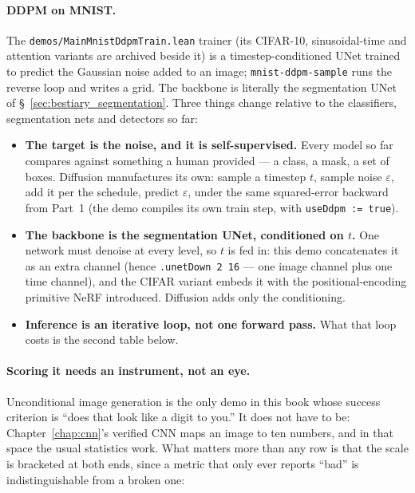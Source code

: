 \paragraph{DDPM on MNIST.} The \texttt{demos/MainMnistDdpmTrain.lean} trainer
(its CIFAR-10, sinusoidal-time and attention variants are archived beside it)
is a timestep-conditioned UNet trained to predict the Gaussian noise added to an
image; \texttt{mnist-ddpm-sample} runs the reverse loop and writes a grid. The
backbone is literally the segmentation UNet of
\S~\ref{sec:bestiary_segmentation}. Three things
change relative to the classifiers, segmentation nets and detectors so far:

\begin{itemize}
  \item \textbf{The target is the noise, and it is self-supervised.} Every model
    so far compares against something a human provided --- a class, a mask, a
    set of boxes. Diffusion manufactures its own: sample a timestep $t$, sample
    noise $\varepsilon$, add it per the schedule, predict $\varepsilon$, under
    the same squared-error backward from Part~1 (the demo compiles its own
    train step, with \texttt{useDdpm := true}).
  \item \textbf{The backbone is the segmentation UNet, conditioned on $t$.} One
    network must denoise at every level, so $t$ is fed in: this demo
    concatenates it as an extra channel (hence \texttt{.unetDown 2 16} --- one
    image channel plus one time channel), and the CIFAR variant embeds it with
    the positional-encoding primitive NeRF introduced. Diffusion adds
    only the conditioning.
  \item \textbf{Inference is an iterative loop, not one forward pass.} What that
    loop costs is the second table below.
\end{itemize}

\paragraph{Scoring it needs an instrument, not an eye.} Unconditional image
generation is the only demo in this book whose success criterion is ``does that
look like a digit to you.'' It does not have to be: Chapter~\ref{chap:cnn}'s
verified CNN maps an image to ten numbers, and in that space the usual
statistics work. What matters more than any row is that the scale is
bracketed at both ends, since a metric that only ever reports ``bad'' is
indistinguishable from a broken one:

